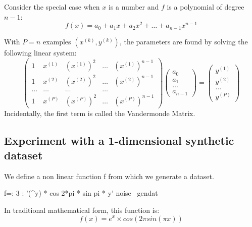 \documentclass[10pt]{article}%
\begin{document}
Consider the special case when $x$ is a number and $f$ is a polynomial of degree $n-1$:
\[
f(x) = a_0 + a_1 x + a_2 x^2 + \dots + a_{n-1}x^{n-1}
\]

With $P=n$ examples $\left(x^{(k)},y^{(k)}\right)$, the parameters are found by
solving the following linear system:
\begin{equation}
\left( \begin{array}{ccccc}
1 & x^{(1)} & (x^{(1)})^2 & \dots & (x^{(1)})^{n-1} \\
1 & x^{(2)} & (x^{(2)})^2 & \dots & (x^{(2)})^{n-1} \\
\dots & \dots & \dots & \dots \\
1 & x^{(P)} & (x^{(P)})^2 & \dots & (x^{(P)})^{n-1}
\end{array} \right)
\left( \begin{array}{c}
a_0 \\ a_1 \\ \dots \\ a_{n-1} 
\end{array} \right)
=
\left( \begin{array}{c}
y^{(1)} \\ y^{(2)} \\ \dots \\ y^{(P)} 
\end{array} \right)
\label{eqn:vandermonde}
\end{equation}
Incidentally, the first term is called the Vandermonde Matrix.

\subsection{Experiment with a 1-dimensional synthetic dataset}
We define a non linear function {\Tt{}f\nwendquote} from which we generate a dataset.

\endmoddef\nwstartdeflinemarkup{}\nwenddeflinemarkup
f=: 3 : '(^y) * cos 2*pi * sin pi * y'
\LA{}noise~{\nwtagstyle{}}\RA{}
\LA{}gendat~{\nwtagstyle{}}\RA{}

\nwendcode{}\nwdocspar
In traditional mathematical form, this function is: 
\[f(x)=e^x \times cos\left(2\pi sin\left(\pi x\right)\right)\]
\end{document}
